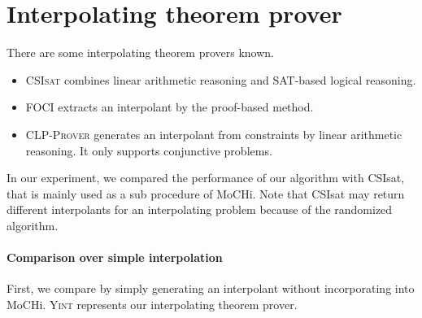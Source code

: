 \section{Interpolating theorem prover}

There are some interpolating theorem provers known.
\begin{itemize}
\item \textsc{CSIsat} \cite{conf/cav/BeyerZM08} combines linear
  arithmetic reasoning and SAT-based logical reasoning.
\item \textsc{FOCI} \cite{website/foci} extracts an interpolant by the
  proof-based method.
\item \textsc{CLP-Prover} \cite{website/clp} generates an interpolant
 from constraints by linear arithmetic reasoning. It only supports
 conjunctive problems.
\end{itemize}

In our experiment, we compared the performance of our algorithm with
CSIsat, that is mainly used as a sub procedure of MoCHi.  Note that
CSIsat may return different interpolants for an interpolating problem
because of the randomized algorithm.

\paragraph{Comparison over simple interpolation}
First, we compare by simply generating an interpolant without
incorporating into MoCHi.  \textsc{Yint} represents our interpolating
theorem prover.

